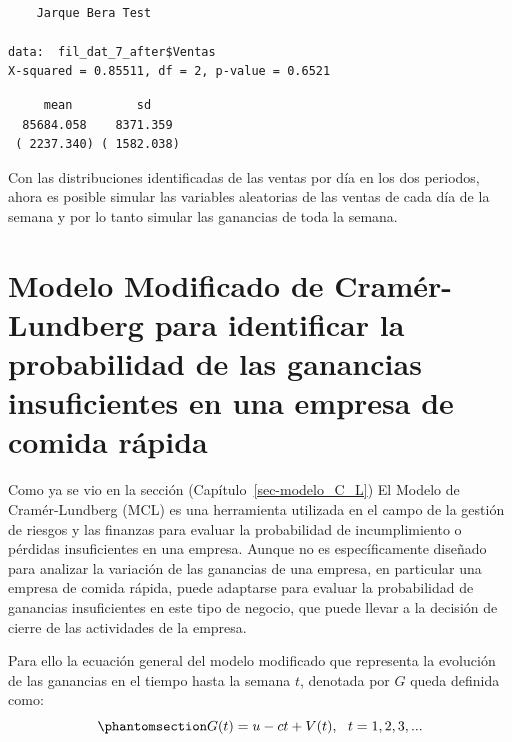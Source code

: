 \documentclass[
  us-letterpaper,
]{scrreprt}
\newenvironment{Shaded}{\begin{snugshade}}{\end{snugshade}}
\newcommand{\CommentTok}[1]{\textcolor[rgb]{0.37,0.37,0.37}{#1}}
\newcommand{\FunctionTok}[1]{\textcolor[rgb]{0.28,0.35,0.67}{#1}}
\newcommand{\NormalTok}[1]{\textcolor[rgb]{0.00,0.23,0.31}{#1}}
\newcommand{\SpecialCharTok}[1]{\textcolor[rgb]{0.37,0.37,0.37}{#1}}
\newcommand{\StringTok}[1]{\textcolor[rgb]{0.13,0.47,0.30}{#1}}
\theoremstyle{definition}
\theoremstyle{plain}
\theoremstyle{plain}
\theoremstyle{remark}
\begin{document}
\begin{verbatim}

    Jarque Bera Test

data:  fil_dat_7_after$Ventas
X-squared = 0.85511, df = 2, p-value = 0.6521
\end{verbatim}

\begin{Shaded}
\end{Shaded}

\begin{verbatim}
     mean         sd    
  85684.058    8371.359 
 ( 2237.340) ( 1582.038)
\end{verbatim}

Con las distribuciones identificadas de las ventas por día en los dos
periodos, ahora es posible simular las variables aleatorias de las
ventas de cada día de la semana y por lo tanto simular las ganancias de
toda la semana.

\section{Modelo Modificado de Cramér-Lundberg para identificar la
probabilidad de las ganancias insuficientes en una empresa de comida
rápida}\label{modelo-modificado-de-cramuxe9r-lundberg-para-identificar-la-probabilidad-de-las-ganancias-insuficientes-en-una-empresa-de-comida-ruxe1pida}

Como ya se vio en la sección (Capítulo~\ref{sec-modelo_C_L}) El Modelo
de Cramér-Lundberg (MCL) es una herramienta utilizada en el campo de la
gestión de riesgos y las finanzas para evaluar la probabilidad de
incumplimiento o pérdidas insuficientes en una empresa. Aunque no es
específicamente diseñado para analizar la variación de las ganancias de
una empresa, en particular una empresa de comida rápida, puede adaptarse
para evaluar la probabilidad de ganancias insuficientes en este tipo de
negocio, que puede llevar a la decisión de cierre de las actividades de
la empresa.

Para ello la ecuación general del modelo modificado que representa la
evolución de las ganancias en el tiempo hasta la semana \(t\), denotada
por \(G\) queda definida como:
\begin{equation}\phantomsection\label{eq-4.1pdf}{G(t) = u -ct + V(t), \ \ t = 1, 2, 3, ...}\end{equation}
\end{document}
